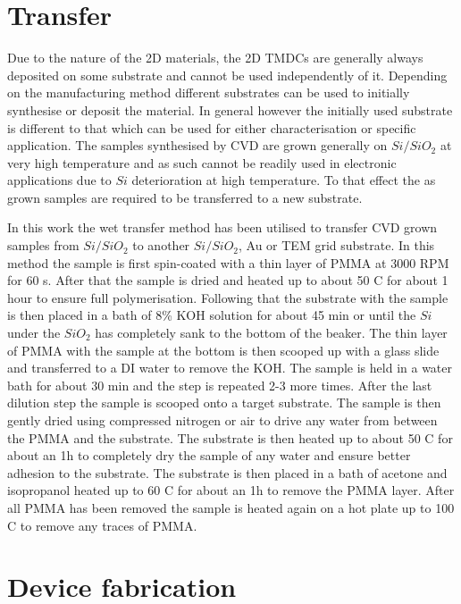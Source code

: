 \section{Transfer}

Due to the nature of the 2D materials, the 2D TMDCs are generally always deposited on some substrate and cannot be used independently of it. Depending on the manufacturing method different substrates can be used to initially synthesise or deposit the material. In general however the initially used substrate is different to that which can be used for either characterisation or specific application. The samples synthesised by CVD are grown generally on $Si/SiO_2$ at very high temperature and as such cannot be readily used in electronic applications due to $Si$ deterioration at high temperature. To that effect the as grown samples are required to be transferred to a new substrate. 

In this work the wet transfer method has been utilised to transfer CVD grown samples from $Si/SiO_2$ to another $Si/SiO_2$, Au or TEM grid substrate. In this method the sample is first spin-coated with a thin layer of PMMA at 3000 RPM for 60 s. After that the sample is dried and heated up to about 50 {\degree}C for about 1 hour to ensure full polymerisation. Following that the substrate with the sample is then placed in a bath of 8\% KOH solution for about 45 min or until the $Si$ under the $SiO_2$ has completely sank to the bottom of the beaker. The thin layer of PMMA with the sample at the bottom is then scooped up with a glass slide and transferred to a DI water to remove the KOH. The sample is held in a water bath for about 30 min and the step is repeated 2-3 more times. After the last dilution step the sample is scooped onto a target substrate. The sample is then gently dried using compressed nitrogen or air to drive any water from between the PMMA and the substrate. The substrate is then heated up to about 50 {\degree}C for about an 1h to completely dry the sample of any water and ensure better adhesion to the substrate. The substrate is then placed in a bath of acetone and isopropanol heated up to 60 {\degree}C for about an 1h to remove the PMMA layer. After all PMMA has been removed the sample is heated again on a hot plate up to 100 {\degree}C to remove any traces of PMMA.

\section{Device fabrication}

